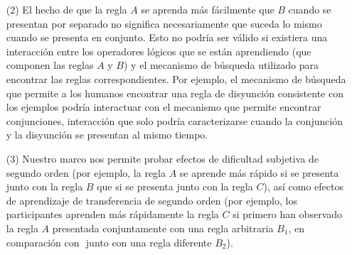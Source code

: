 \begin{enumerate}
\item [(2)] 
El hecho de que la regla $A$ se aprenda más fácilmente que $B$ cuando se presentan por separado no significa necesariamente que suceda lo mismo cuando se presenta en conjunto. Esto no podría ser válido si existiera una interacción entre los operadores lógicos que se están aprendiendo (que componen las reglas $A$ y $B$) y el mecanismo de búsqueda utilizado para encontrar las reglas correspondientes. Por ejemplo, el mecanismo de búsqueda que permite a los humanos encontrar una regla de disyunción consistente con los ejemplos podría interactuar con el mecanismo que permite encontrar conjunciones, interacción que solo podría caracterizarse cuando la conjunción y la disyunción se presentan al mismo tiempo.

\item [(3)] 
Nuestro marco nos permite probar efectos de dificultad subjetiva de segundo orden (por ejemplo, la regla $A$ se aprende más rápido si se presenta junto con la regla $B$ que si se presenta junto con la regla $C$), así como efectos de aprendizaje de transferencia de segundo orden (por ejemplo, los participantes aprenden más rápidamente la regla $C$ si primero han observado la regla $A$ presentada conjuntamente con una regla arbitraria $B_1$, en comparación con $ $ junto con una regla diferente $B_2$).


\end{enumerate}
